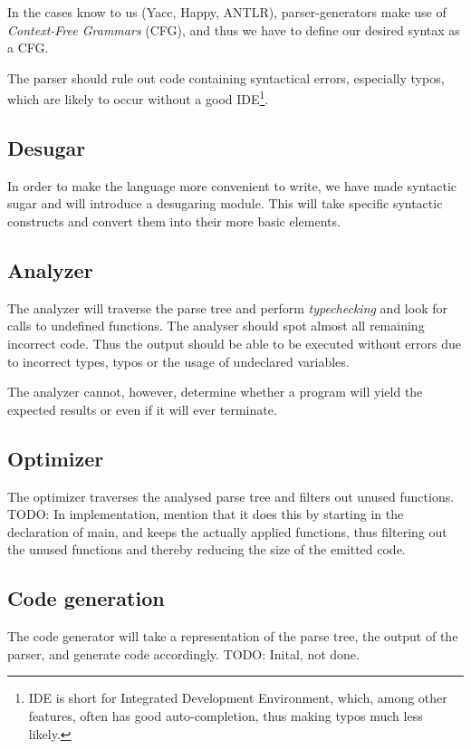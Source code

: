 In the cases know to us (Yacc, Happy, ANTLR), parser-generators make use of \emph{Context-Free Grammars} (CFG), and thus we have to define our desired syntax as a CFG.

The parser should rule out code containing syntactical errors, especially typos, which are likely to occur without a good IDE\footnote{IDE is short for Integrated Development Environment, which, among other features, often has good auto-completion, thus making typos much less likely.}.

\subsection{Desugar}
In order to make the language more convenient to write, we have made syntactic sugar and will introduce a desugaring module. This will take specific syntactic constructs and convert them into their more basic elements.

\subsection{Analyzer}
The analyzer will traverse the parse tree and perform \emph{typechecking} and look for calls to undefined functions. The analyser should spot almost all remaining incorrect code. Thus the output should be able to be executed without errors due to incorrect types, typos or the usage of undeclared variables.

The analyzer cannot, however, determine whether a program will yield the expected results or even if it will ever terminate.


\subsection{Optimizer}
The optimizer traverses the analysed parse tree and filters out unused functions. 
TODO: In implementation, mention that it does this by starting in the declaration of main, and keeps the actually applied functions, thus filtering out the unused functions and thereby reducing the size of the emitted code. 


\subsection{Code generation}
The code generator will take a representation of the
parse tree, the output of the parser, and generate code
accordingly. TODO: Inital, not done.
